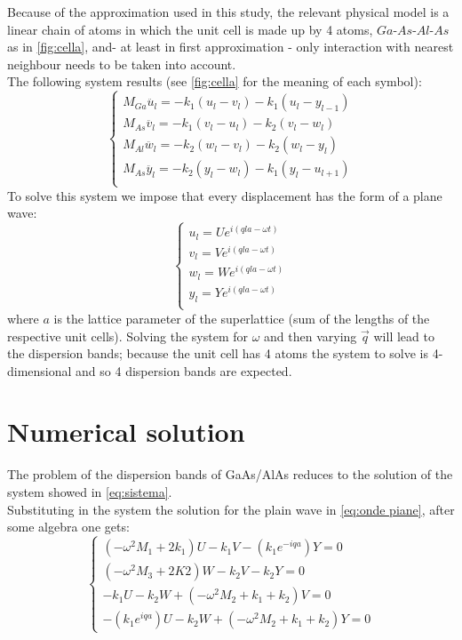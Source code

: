 \documentclass{article}
\begin{document}
Because of the approximation used in this study, the relevant physical model is a linear chain of atoms in which the unit cell is made up by 4 atoms, $Ga$-$As$-$Al$-$As$ as in \autoref{fig:cella}, and- at least in first approximation - only interaction with nearest neighbour needs to be taken into account. \\
The following system results (see \autoref{fig:cella} for the meaning of each symbol):
\begin{equation}
	\begin{cases}
	M_{Ga}\ddot{u_l} = -k_1(u_l-v_l) - k_1(u_l-y_{l-1}) \\
	M_{As}\ddot{v_l} = -k_1(v_l-u_l) - k_2(v_l-w_l) \\
	M_{Al}\ddot{w_l} = -k_2(w_l-v_l) - k_2(w_l-y_l) \\
	M_{As}\ddot{y_l} = -k_2(y_l-w_l) - k_1(y_l-u_{l+1}) \\
	\end{cases}
	\label{eq:sistema}	
\end{equation}
To solve this system we impose that every displacement has the form of a plane wave:
\begin{equation}
	\begin{cases}
	u_l = Ue^{i(qla-\omega t)} \\
	v_l = Ve^{i(qla-\omega t)} \\
	w_l = We^{i(qla-\omega t)} \\
	y_l = Ye^{i(qla-\omega t)} \\
	\end{cases}
	\label{eq:onde piane}
\end{equation}
where $a$ is the lattice parameter of the superlattice (sum of the lengths of the respective unit cells).
Solving the system for $\omega$ and then varying $\vec{q}$ will lead to the dispersion bands; because the unit cell has 4 atoms the system to solve is 4-dimensional and so 4 dispersion bands are expected.  

\section{Numerical solution}
The problem of the dispersion bands of GaAs/AlAs reduces to the solution of the system showed in \autoref{eq:sistema}. \\
Substituting in the system the solution for the plain wave in \autoref{eq:onde piane}, after some algebra one gets:
\begin{equation}
	\begin{cases}
	(-\omega^2M_1 + 2k_1)U - k_1V - (k_1e^{-iqa})Y = 0 \\
    (-\omega^2M_3 + 2K2)W -k_2V - k_2Y = 0 \\
	-k_1U -k_2W + (-\omega^2M_2 + k_1 + k_2)V = 0 \\
	-(k_1e^{iqa})U - k_2W + (-\omega^2M_2 + k_1 + k_2)Y = 0	
	\end{cases}
	\label{sist.final}
\end {equation}
\end{document}
